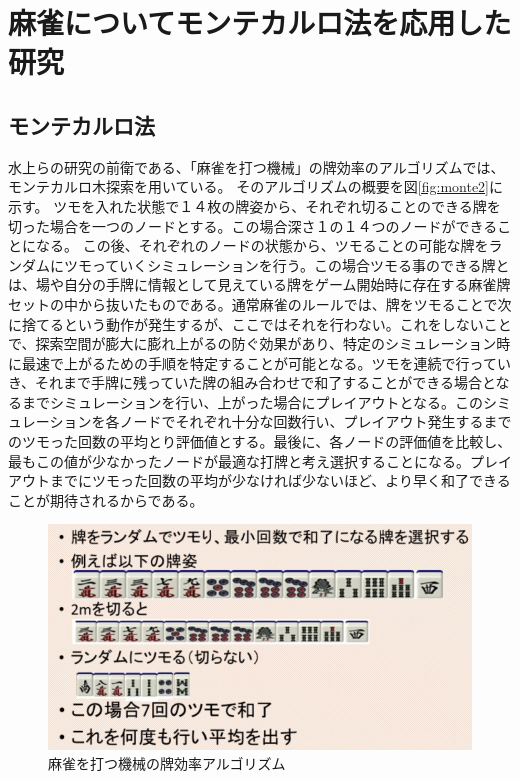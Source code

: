 \section{麻雀についてモンテカルロ法を応用した研究}
\subsection{モンテカルロ法}

水上ら\cite{bakuuti}の研究の前衛である、「麻雀を打つ機械」\cite{nmizu}の牌効率のアルゴリズムでは、モンテカルロ木探索を用いている。
そのアルゴリズムの概要を図\ref{fig:monte2}に示す。
ツモを入れた状態で１４枚の牌姿から、それぞれ切ることのできる牌を切った場合を一つのノードとする。この場合深さ１の１４つのノードができることになる。
この後、それぞれのノードの状態から、ツモることの可能な牌をランダムにツモっていくシミュレーションを行う。この場合ツモる事のできる牌とは、場や自分の手牌に情報として見えている牌をゲーム開始時に存在する麻雀牌セットの中から抜いたものである。通常麻雀のルールでは、牌をツモることで次に捨てるという動作が発生するが、ここではそれを行わない。これをしないことで、探索空間が膨大に膨れ上がるの防ぐ効果があり、特定のシミュレーション時に最速で上がるための手順を特定することが可能となる。ツモを連続で行っていき、それまで手牌に残っていた牌の組み合わせで和了することができる場合となるまでシミュレーションを行い、上がった場合にプレイアウトとなる。このシミュレーションを各ノードでそれぞれ十分な回数行い、プレイアウト発生するまでのツモった回数の平均とり評価値とする。最後に、各ノードの評価値を比較し、最もこの値が少なかったノードが最適な打牌と考え選択することになる。プレイアウトまでにツモった回数の平均が少なければ少ないほど、より早く和了できることが期待されるからである。

\begin{figure}
 \centering
 \includegraphics[keepaspectratio, scale=0.25,bb=0 0 808 429]
      {img/monte1.png}
 \caption{麻雀を打つ機械の牌効率アルゴリズム}
 \label{monte1}
\end{figure}

